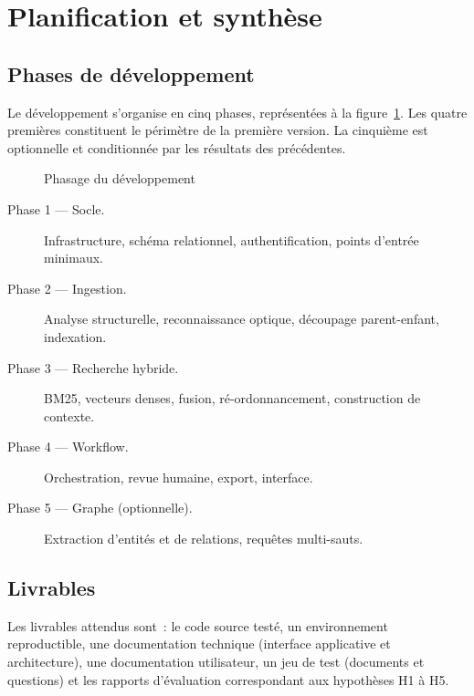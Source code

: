 \section{Planification et synthèse}
\label{sec:ch2-planification}

\subsection{Phases de développement}

Le développement s'organise en cinq phases, représentées à la
figure~\ref{fig:phases}. Les quatre premières constituent le périmètre de
la première version. La cinquième est optionnelle et conditionnée par les
résultats des précédentes.

\begin{figure}[htbp]
  \centering
  \resizebox{\linewidth}{!}{}
  \caption{Phasage du développement}
  \label{fig:phases}
\end{figure}

\begin{description}
  \item[Phase 1 --- Socle.] Infrastructure, schéma relationnel,
        authentification, points d'entrée minimaux.
  \item[Phase 2 --- Ingestion.] Analyse structurelle, reconnaissance
        optique, découpage parent-enfant, indexation.
  \item[Phase 3 --- Recherche hybride.] BM25, vecteurs denses, fusion,
        ré-ordonnancement, construction de contexte.
  \item[Phase 4 --- Workflow.] Orchestration, revue humaine, export,
        interface.
  \item[Phase 5 --- Graphe (optionnelle).] Extraction d'entités et de
        relations, requêtes multi-sauts.
\end{description}

\subsection{Livrables}

Les livrables attendus sont~: le code source testé, un environnement
reproductible, une documentation technique (interface applicative et
architecture), une documentation utilisateur, un jeu de test (documents et
questions) et les rapports d'évaluation correspondant aux hypothèses H1
à H5.

